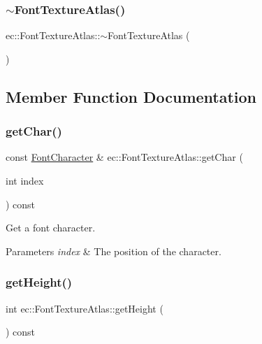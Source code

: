 \subsubsection{\texorpdfstring{$\sim$\+Font\+Texture\+Atlas()}{~FontTextureAtlas()}}
{\footnotesize\ttfamily ec\+::\+Font\+Texture\+Atlas\+::$\sim$\+Font\+Texture\+Atlas (\begin{DoxyParamCaption}{ }\end{DoxyParamCaption})}



\subsection{Member Function Documentation}
\mbox{\label{classec_1_1_font_texture_atlas_a4587f2074d6295364a6ab7bac4a5846d}} 
\subsubsection{\texorpdfstring{get\+Char()}{getChar()}}
{\footnotesize\ttfamily const \mbox{\hyperlink{structec_1_1_font_character}{Font\+Character}} \& ec\+::\+Font\+Texture\+Atlas\+::get\+Char (\begin{DoxyParamCaption}\item[{int}]{index }\end{DoxyParamCaption}) const}



Get a font character. 


\begin{DoxyParams}{Parameters}
{\em index} & The position of the character. \\
\hline
\end{DoxyParams}
\mbox{\label{classec_1_1_font_texture_atlas_aa6e4a6f124b7fed58783c48c78300244}} 
\subsubsection{\texorpdfstring{get\+Height()}{getHeight()}}
{\footnotesize\ttfamily int ec\+::\+Font\+Texture\+Atlas\+::get\+Height (\begin{DoxyParamCaption}{ }\end{DoxyParamCaption}) const}



